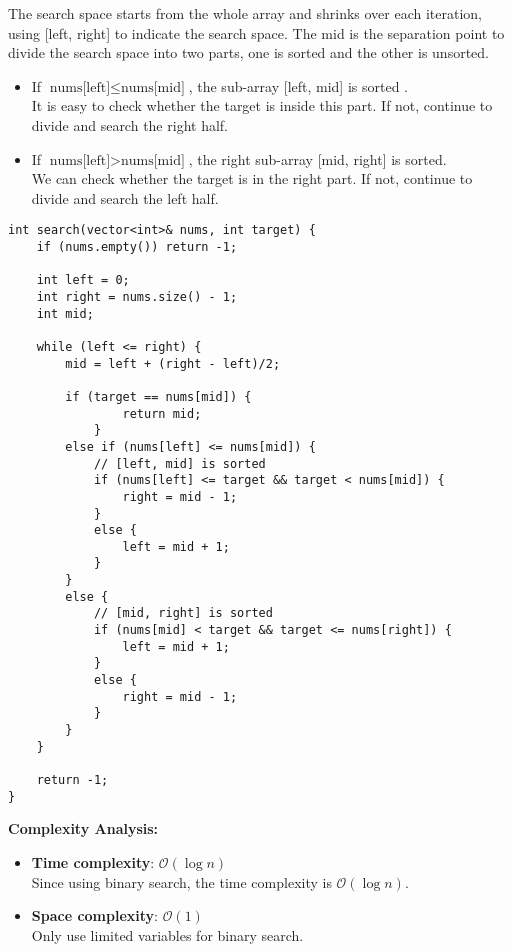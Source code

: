 \documentclass[justified]{tufte-book}
\begin{document}
The search space starts from the whole array and shrinks over each iteration, using [left, right] to indicate the search space. The mid is the separation point to divide the search space into two parts, one is sorted and the other is unsorted.   
\begin{itemize}
    \item If $\text{nums[left]} \leq \text{nums[mid]}$, the sub-array [left, mid] is sorted . \\
    It is easy to check whether the target is inside this part. If not, continue to divide and search the right half.
    \item If $\text{nums[left]} > \text{nums[mid]}$, the right sub-array [mid, right] is sorted. \\
    We can check whether the target is in the right part. If not, continue to divide and search the left half.
\end{itemize}

\begin{lstlisting}
int search(vector<int>& nums, int target) {
    if (nums.empty()) return -1;
    
    int left = 0;
    int right = nums.size() - 1;
    int mid; 
    
    while (left <= right) {
        mid = left + (right - left)/2;
        
        if (target == nums[mid]) {
                return mid;
            }
        else if (nums[left] <= nums[mid]) {
            // [left, mid] is sorted
            if (nums[left] <= target && target < nums[mid]) {
                right = mid - 1;
            }
            else {
                left = mid + 1;
            }
        }
        else {
            // [mid, right] is sorted
            if (nums[mid] < target && target <= nums[right]) {
                left = mid + 1;
            }
            else {
                right = mid - 1;
            }
        }
    }
    
    return -1;
}           
\end{lstlisting}
\noindent \textbf{Complexity Analysis:}
\begin{itemize}
    \item \textbf{Time complexity}: $\mathcal{O}(\log n)$ \\
    Since using binary search, the time complexity is $\mathcal{O}(\log n)$.
    \item \textbf{Space complexity}: $\mathcal{O}(1)$ \\
    Only use limited variables for binary search.
\end{itemize}
\end{document}
